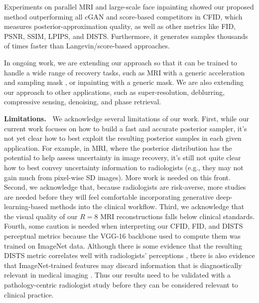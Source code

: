 \documentclass{article}
\theoremstyle{plain}
\theoremstyle{definition}
\theoremstyle{remark}
\renewcommand{\vec}[1]{\ensuremath{\boldsymbol{#1}}}
\newcommand{\textr}[1]{\textcolor{red}{#1}}
\begin{document}
Experiments on parallel MRI and large-scale face inpainting showed our proposed method outperforming all cGAN and score-based competitors in CFID, which measures posterior-approximation quality, as well as other metrics like FID, PSNR, SSIM, LPIPS, and DISTS.
Furthermore, it generates samples thousands of times faster than Langevin/score-based approaches.

In ongoing work, we are extending our approach so that it can be trained to handle a wide range of recovery tasks, such as MRI with a generic acceleration and sampling mask \cite{Bendel:NIPSW:23}, or inpainting with a generic mask.
We are also extending our approach to other applications, such as super-resolution, deblurring, compressive sensing, denoising, and phase retrieval.

\textbf{Limitations.~} 
We acknowledge several limitations of our work.
First, while our current work focuses on how to build a fast and accurate posterior sampler, it's not yet clear how to best exploit the resulting posterior samples in each given application.
For example, in MRI, where the posterior distribution has the potential to help assess uncertainty in image recovery, it's still not quite clear how to best convey uncertainty information to radiologists (e.g., they may not gain much from pixel-wise SD images).
More work is needed on this front.
Second, we acknowledge that, because radiologists are risk-averse, more studies are needed before they will feel comfortable incorporating generative deep-learning-based methods into the clinical workflow.
Third, we acknowledge that the visual quality of our $R=8$ MRI reconstructions falls below clinical standards.
Fourth, some caution is needed when interpreting our CFID, FID, and DISTS perceptual metrics because the VGG-16 backbone used to compute them was trained on ImageNet data. 
Although there is some evidence that the resulting DISTS metric correlates well with radiologists' perceptions \cite{Kastryulin:22}, there is also evidence that ImageNet-trained features may discard information that is diagnostically relevant in medical imaging \cite{Kynkaanniemi:22}.
Thus our results need to be validated with a pathology-centric radiologist study before they can be considered relevant to clinical practice.
\end{document}
